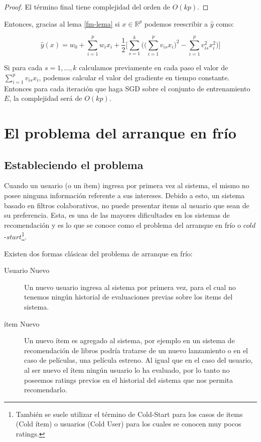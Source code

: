 \documentclass[hidelinks,12pt,a4paper]{book}
\theoremstyle{plain}
\theoremstyle{definition}
\begin{document}
\begin{proof}
El término final tiene complejidad del orden de $O(kp)$.
\end{proof}

Entonces, gracias al lema \ref{fm-lema} si $x\in\mathbb{R}^p$ podemos reescribir a $\hat{y}$  como:

\begin{equation}
\hat{y}(x)=w_0+\sum_{i=1}^p w_i x_i + \frac{1}{2} \big[\sum_{s=1}^k \big( \big( \sum_{i=1}^p v_{is} x_i \big)^2 - \sum_{i=1}^p  v_{is}^2 x_i^2 \big) \big]
\end{equation}

Si para cada $s=1,\ldots,k$ calculamos previamente en cada paso el valor de $\sum_{i=1}^p v_{is} x_i$, podemos calcular el valor del gradiente en tiempo constante. Entonces para cada iteración que haga SGD sobre el conjunto de entrenamiento $E$, la complejidad será de $O(kp)$. 


\chapter{El problema del arranque en frío}

\section{Estableciendo el problema}

Cuando un usuario (o un ítem) ingresa por primera vez al sistema, el mismo no posee ninguna información referente a sus intereses. Debido a esto, un sistema basado en filtros colaborativos, no puede presentar items al usuario que sean de su preferencia. Esta, es una de las mayores dificultades en los sistemas de recomendación y es lo que se conoce como el problema del arranque en frío o $cold$-$start$\footnote{También se suele utilizar el término de Cold-Start para los casos de items (Cold ítem) o usuarios (Cold User) para los cuales se conocen muy pocos ratings.}.

Existen dos formas clásicas del problema de arranque en frío:

\begin{description}
\item[Usuario Nuevo] Un nuevo usuario ingresa al sistema por primera vez, para el cual no tenemos ningún historial de evaluaciones previas sobre los items del sistema.
\item[ítem Nuevo] Un nuevo ítem es agregado al sistema, por ejemplo en un sistema de recomendación de libros podría tratarse de un nuevo lanzamiento o en el caso de películas, una película estreno. Al igual que en el caso del usuario, al ser nuevo el ítem ningún usuario lo ha evaluado, por lo tanto no poseemos ratings previos en el historial del sistema que nos permita recomendarlo.
\end{description}
\end{document}
